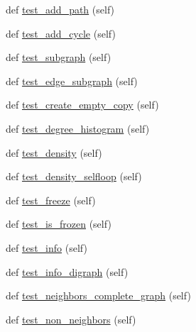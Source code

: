 \begin{DoxyCompactItemize}
def \hyperlink{classnetworkx_1_1classes_1_1tests_1_1test__function_1_1TestFunction_ab985a46467534dee3bde8c89d41ea15a}{test\+\_\+add\+\_\+path} (self)
\item 
def \hyperlink{classnetworkx_1_1classes_1_1tests_1_1test__function_1_1TestFunction_a6f3bf3061506acd0e4a5aaf115dbbdec}{test\+\_\+add\+\_\+cycle} (self)
\item 
def \hyperlink{classnetworkx_1_1classes_1_1tests_1_1test__function_1_1TestFunction_a5eb64041abdb29aa18d3d42fc55bffa8}{test\+\_\+subgraph} (self)
\item 
def \hyperlink{classnetworkx_1_1classes_1_1tests_1_1test__function_1_1TestFunction_ac9107e8d1cec0adb8df5dea4a387cb07}{test\+\_\+edge\+\_\+subgraph} (self)
\item 
def \hyperlink{classnetworkx_1_1classes_1_1tests_1_1test__function_1_1TestFunction_ab92c2772b70f5651d77f12b5f513fb46}{test\+\_\+create\+\_\+empty\+\_\+copy} (self)
\item 
def \hyperlink{classnetworkx_1_1classes_1_1tests_1_1test__function_1_1TestFunction_a68eb32e308855443dccea3c5ce2a9b6b}{test\+\_\+degree\+\_\+histogram} (self)
\item 
def \hyperlink{classnetworkx_1_1classes_1_1tests_1_1test__function_1_1TestFunction_acadaf42e1fa8eef2878768c9b8b18ca5}{test\+\_\+density} (self)
\item 
def \hyperlink{classnetworkx_1_1classes_1_1tests_1_1test__function_1_1TestFunction_a6ec0f6160f4bf9a0eef8b836d7cdce6f}{test\+\_\+density\+\_\+selfloop} (self)
\item 
def \hyperlink{classnetworkx_1_1classes_1_1tests_1_1test__function_1_1TestFunction_a2b63fc36c1cbb3624b31325a8e81563f}{test\+\_\+freeze} (self)
\item 
def \hyperlink{classnetworkx_1_1classes_1_1tests_1_1test__function_1_1TestFunction_a0b2ccd71574aa691b508543979207124}{test\+\_\+is\+\_\+frozen} (self)
\item 
def \hyperlink{classnetworkx_1_1classes_1_1tests_1_1test__function_1_1TestFunction_a2af78a5f9931464bb372010f2f775adf}{test\+\_\+info} (self)
\item 
def \hyperlink{classnetworkx_1_1classes_1_1tests_1_1test__function_1_1TestFunction_ab6673e69243431ea3c00e96b6b99ee88}{test\+\_\+info\+\_\+digraph} (self)
\item 
def \hyperlink{classnetworkx_1_1classes_1_1tests_1_1test__function_1_1TestFunction_adbb50a04a41a6e0eb27723920a39256a}{test\+\_\+neighbors\+\_\+complete\+\_\+graph} (self)
\item 
def \hyperlink{classnetworkx_1_1classes_1_1tests_1_1test__function_1_1TestFunction_a65770d62b8d8e5710315421715cbf930}{test\+\_\+non\+\_\+neighbors} (self)

\end{DoxyCompactItemize}

